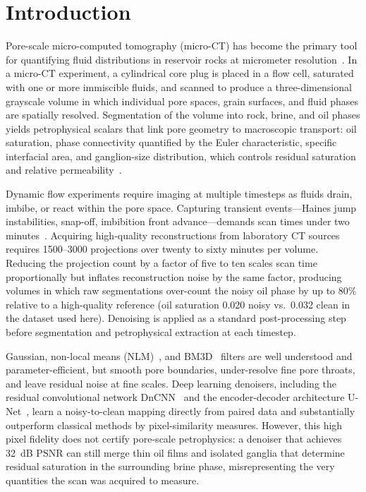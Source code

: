 \documentclass[review,12pt]{elsarticle}
\begin{document}
\section{Introduction}
\label{sec:intro}

Pore-scale micro-computed tomography (micro-CT) has become the primary
tool for quantifying fluid distributions in reservoir rocks at
micrometer resolution~\cite{Blunt2013,Wildenschild2013}.  In a
micro-CT experiment, a cylindrical core plug is placed in a flow cell,
saturated with one or more immiscible fluids, and scanned to produce a
three-dimensional grayscale volume in which individual pore spaces,
grain surfaces, and fluid phases are spatially resolved.  Segmentation
of the volume into rock, brine, and oil phases yields petrophysical
scalars that link pore geometry to macroscopic transport: oil
saturation, phase connectivity quantified by the Euler characteristic,
specific interfacial area, and ganglion-size distribution, which
controls residual saturation and relative
permeability~\cite{Berg2013,Andrew2014}.

Dynamic flow experiments require imaging at multiple timesteps as
fluids drain, imbibe, or react within the pore space.  Capturing
transient events---Haines jump instabilities, snap-off, imbibition
front advance---demands scan times under two
minutes~\cite{Berg2013}.  Acquiring high-quality reconstructions from
laboratory CT sources requires 1500--3000 projections over twenty to
sixty minutes per volume.  Reducing the projection count by a factor of
five to ten scales scan time proportionally but inflates reconstruction
noise by the same factor, producing volumes in which raw segmentations
over-count the noisy oil phase by up to 80\% relative to a high-quality
reference (oil saturation 0.020 noisy vs.\ 0.032 clean in the dataset
used here).  Denoising is applied as a standard post-processing step
before segmentation and petrophysical extraction at each timestep.

Gaussian, non-local means (NLM)~\cite{Buades2005cvpr}, and
BM3D~\cite{Dabov2007} filters are well understood and
parameter-efficient, but smooth pore boundaries, under-resolve fine
pore throats, and leave residual noise at fine scales.  Deep learning
denoisers, including the residual convolutional network
DnCNN~\cite{Zhang2017dncnn} and the encoder-decoder architecture
U-Net~\cite{Ronneberger2015}, learn a
noisy-to-clean mapping directly from paired data and substantially
outperform classical methods by pixel-similarity measures.  However,
this high pixel fidelity does not certify pore-scale petrophysics: a
denoiser that achieves 32~dB PSNR can still merge thin oil films and
isolated ganglia that determine residual saturation in the surrounding
brine phase, misrepresenting the very quantities the scan was acquired
to measure.
\end{document}
